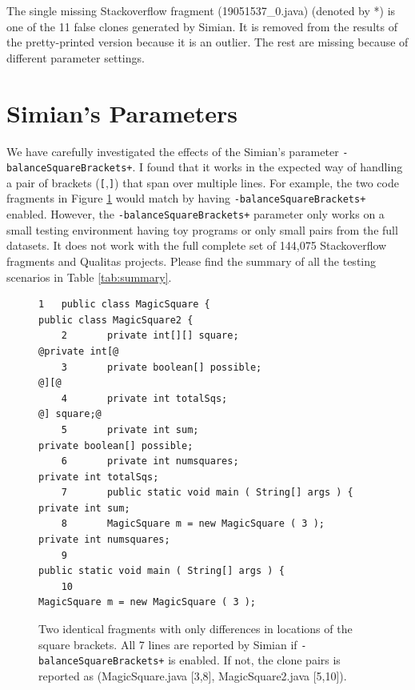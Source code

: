 \documentclass{sig-alternate-05-2015}
\begin{document}
The single missing Stackoverflow fragment (19051537\_0.java) (denoted by *) is one of the 11 false clones generated by Simian. It is removed from the results of the pretty-printed version because it is an outlier. The rest are missing because of different parameter settings.

\section{Simian's Parameters}

We have carefully investigated the effects of the Simian's parameter \texttt{-balanceSquareBrackets+}. I found that it works in the expected way of handling a pair of brackets (\texttt{[},\texttt{]}) that span over multiple lines. For example, the two code fragments in Figure \ref{fig:two_frags} would match by having \texttt{-balanceSquareBrackets+} enabled. However, the \texttt{-balanceSquareBrackets+} parameter only works on a small testing environment having toy programs or only small pairs from the full datasets. It does not work with the full complete set of 144,075 Stackoverflow fragments and Qualitas projects. Please find the summary of all the testing scenarios in Table \ref{tab:summary}. %

\noindent\begin{figure}
	\scriptsize
	\begin{lstlisting}[frame=single,style=base]
	1   public class MagicSquare {                           public class MagicSquare2 {
	2       private int[][] square;                              @private int[@
	3       private boolean[] possible;                                      @][@
	4       private int totalSqs;                                            @] square;@
	5       private int sum;                                     private boolean[] possible;
	6       private int numsquares;                              private int totalSqs;
	7       public static void main ( String[] args ) {          private int sum;
	8       MagicSquare m = new MagicSquare ( 3 );               private int numsquares;
	9                                                            public static void main ( String[] args ) {
	10                                                           MagicSquare m = new MagicSquare ( 3 );
	\end{lstlisting}
	\caption{Two identical fragments with only differences in locations of the square brackets. All 7 lines are reported by Simian if \small\texttt{-balanceSquareBrackets+} \normalsize is enabled. If not, the clone pairs is reported as \newline (MagicSquare.java [3,8], MagicSquare2.java [5,10]).} 
	\label{fig:two_frags}
\end{figure}
\end{document}
